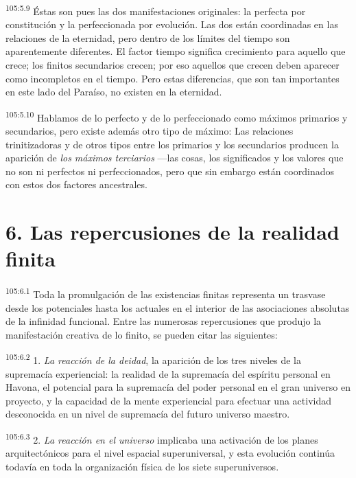 \par
\textsuperscript{105:5.9} Éstas son pues las dos manifestaciones originales: la perfecta por constitución y la perfeccionada por evolución. Las dos están coordinadas en las relaciones de la eternidad, pero dentro de los límites del tiempo son aparentemente diferentes. El factor tiempo significa crecimiento para aquello que crece; los finitos secundarios crecen; por eso aquellos que crecen deben aparecer como incompletos en el tiempo. Pero estas diferencias, que son tan importantes en este lado del Paraíso, no existen en la eternidad.

\par
\textsuperscript{105:5.10} Hablamos de lo perfecto y de lo perfeccionado como máximos primarios y secundarios, pero existe además otro tipo de máximo: Las relaciones trinitizadoras y de otros tipos entre los primarios y los secundarios producen la aparición de \textit{los máximos terciarios} ---las cosas, los significados y los valores que no son ni perfectos ni perfeccionados, pero que sin embargo están coordinados con estos dos factores ancestrales.

\section*{6. Las repercusiones de la realidad finita}
\par
\textsuperscript{105:6.1} Toda la promulgación de las existencias finitas representa un trasvase desde los potenciales hasta los actuales en el interior de las asociaciones absolutas de la infinidad funcional. Entre las numerosas repercusiones que produjo la manifestación creativa de lo finito, se pueden citar las siguientes:

\par
\textsuperscript{105:6.2} 1. \textit{La reacción de la deidad}, la aparición de los tres niveles de la supremacía experiencial: la realidad de la supremacía del espíritu personal en Havona, el potencial para la supremacía del poder personal en el gran universo en proyecto, y la capacidad de la mente experiencial para efectuar una actividad desconocida en un nivel de supremacía del futuro universo maestro.

\par
\textsuperscript{105:6.3} 2. \textit{La reacción en el universo} implicaba una activación de los planes arquitectónicos para el nivel espacial superuniversal, y esta evolución continúa todavía en toda la organización física de los siete superuniversos.

